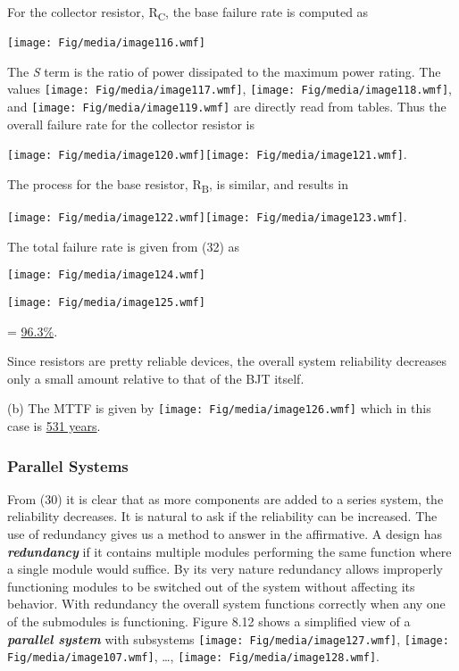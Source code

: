 For the collector resistor, R\textsubscript{C}, the base failure rate is
computed as

\texttt{[image: Fig/media/image116.wmf]}

The \emph{S} term is the ratio of power dissipated to the maximum power
rating. The values \texttt{[image: Fig/media/image117.wmf]},
\texttt{[image: Fig/media/image118.wmf]}, and
\texttt{[image: Fig/media/image119.wmf]} are directly read from tables.
Thus the overall failure rate for the collector resistor is

\texttt{[image: Fig/media/image120.wmf]}\texttt{[image: Fig/media/image121.wmf]}.

The process for the base resistor, R\textsubscript{B}, is similar, and
results in

\texttt{[image: Fig/media/image122.wmf]}\texttt{[image: Fig/media/image123.wmf]}.

The total failure rate is given from (32) as

\texttt{[image: Fig/media/image124.wmf]}

\texttt{[image: Fig/media/image125.wmf]}

= \ul{96.3\%}.

Since resistors are pretty reliable devices, the overall system
reliability decreases only a small amount relative to that of the BJT
itself.

(b) The MTTF is given by \texttt{[image: Fig/media/image126.wmf]} which
in this case is \ul{531 years}.

\subsubsection{Parallel Systems}\label{parallel-systems}

From (30) it is clear that as more components are added to a series
system, the reliability decreases. It is natural to ask if the
reliability can be increased. The use of redundancy gives us a method to
answer in the affirmative. A design has \emph{\textbf{redundancy}} if it
contains multiple modules performing the same function where a single
module would suffice. By its very nature redundancy allows improperly
functioning modules to be switched out of the system without affecting
its behavior. With redundancy the overall system functions correctly
when any one of the submodules is functioning. Figure 8.12 shows a
simplified view of a \emph{\textbf{parallel system}} with subsystems
\texttt{[image: Fig/media/image127.wmf]},
\texttt{[image: Fig/media/image107.wmf]}, \ldots,
\texttt{[image: Fig/media/image128.wmf]}.

